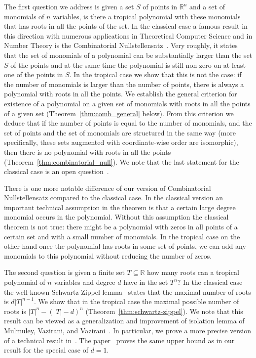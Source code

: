 \documentclass[11pt]{article}
\newcommand{\bb}[1]{\mathbb{#1}}
\begin{document}
The first question we address is given a set $S$ of points in $\bb{R}^n$ and a set of monomials of $n$ variables, is there a tropical polynomial with these monomials that has roots in all the points of the set. In the classical case a famous result in this direction with numerous applications in Theoretical Computer Science and in Number Theory is the Combinatorial Nullstellensatz~\cite{Alon99}. Very roughly, it states that the set of monomials of a polynomial can be substantially larger than the set $S$ of the points and at the same time the polynomial is still non-zero on at least one of the points in $S$. In the tropical case we show that this is not the case: if the number of monomials is larger than the number of points, there is always a polynomial with roots in all the points. We establish the general criterion for existence of a polynomial on a given set of monomials with roots in all the points of a given set (Theorem~\ref{thm:comb_general} below). From this criterion we deduce that if the number of points is equal to the number of monomials, and the set of points and the set of monomials are structured in the same way (more specifically, these sets augmented with coordinate-wise order are isomorphic), then there is no polynomial with roots in all the points (Theorem~\ref{thm:combinatorial_null}). We note that the last statement for the classical case is an open question~\cite{Risler90}.

There is one more notable difference of our version of Combinatorial Nullstellensatz compared to the classical case. In the classical version an important technical assumption in the theorem is that a certain large degree monomial occurs in the polynomial. Without this assumption the classical theorem is not true: there might be a polynomial with zeros in all points of a certain set and with a small number of monomials. In the tropical case on the other hand once the polynomial has roots in some set of points, we can add any monomials to this polynomial without reducing the number of zeros.

The second question is given a finite set $T \subseteq \bb{R}$ how many roots can a tropical polynomial of $n$ variables and degree $d$  have in the set $T^n$? In the classical case the well-known Schwartz-Zippel lemma~\cite{Zippel79,Schwartz80} states that the maximal number of roots is $d|T|^{n-1}$. We show that in the tropical case the maximal possible number of roots is $|T|^n - (|T|-d)^n$ (Theorem~\ref{thm:schwartz-zippel}).
We note that this result can be viewed as a generalization and improvement of isolation lemma of Mulmuley, Vazirani, and Vazirani~\cite{Mulmuley87,CRS95isolation,Klivans01,Ta-Shma15}. In particular, we prove a more precise version of a technical result in~\cite[Lemma~4]{Klivans01}. The paper~\cite{Ta-Shma15} proves the same upper bound as in our result for the special case of $d=1$.
\end{document}
